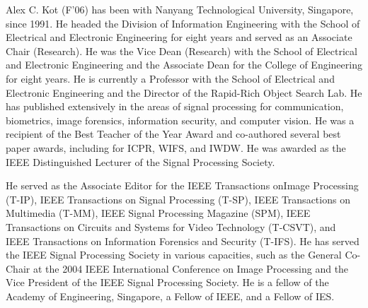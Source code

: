 \documentclass[journal,twoside]{IEEEtran}
\begin{document}
\begin{IEEEbiography}{Alex C. Kot}
(F'06) has been with Nanyang Technological University, Singapore, since 1991. He headed the Division of Information Engineering with the School of Electrical and Electronic Engineering for eight years and served as an Associate Chair (Research). He was the Vice Dean (Research) with the School of Electrical and Electronic Engineering and the Associate Dean for the College of Engineering for eight years. He is currently a Professor with the School of Electrical and Electronic Engineering and the Director of the Rapid-Rich Object Search Lab. He has published extensively in the areas of signal processing for communication, biometrics, image forensics, information security, and computer vision. He was a recipient of the Best Teacher of the Year Award and co-authored several best paper awards, including for ICPR, WIFS, and IWDW. He was awarded as the IEEE Distinguished Lecturer of the Signal Processing Society.

He served as the Associate Editor for the IEEE Transactions onImage Processing (T-IP), IEEE Transactions on Signal Processing (T-SP), IEEE Transactions on Multimedia (T-MM), IEEE Signal Processing Magazine (SPM), IEEE Transactions on Circuits and Systems for Video Technology (T-CSVT), and IEEE Transactions on Information Forensics and Security (T-IFS). He has served the IEEE Signal Processing Society in various capacities, such as the General Co-Chair at the 2004 IEEE International Conference on Image Processing and the Vice President of the IEEE Signal Processing Society. He is a fellow of the Academy of Engineering, Singapore, a Fellow of IEEE, and a Fellow of IES.
\end{IEEEbiography}

\vfill
\end{document}
